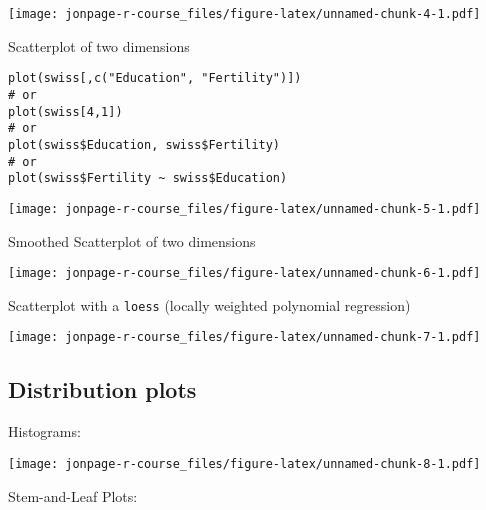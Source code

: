\documentclass[]{book}
\newenvironment{Shaded}{\begin{snugshade}}{\end{snugshade}}
\newcommand{\KeywordTok}[1]{\textcolor[rgb]{0.13,0.29,0.53}{\textbf{{#1}}}}
\newcommand{\StringTok}[1]{\textcolor[rgb]{0.31,0.60,0.02}{{#1}}}
\newcommand{\NormalTok}[1]{{#1}}
\begin{document}
\texttt{[image: jonpage-r-course\_files/figure-latex/unnamed-chunk-4-1.pdf]}

Scatterplot of two dimensions

\begin{verbatim}
plot(swiss[,c("Education", "Fertility")])
# or
plot(swiss[4,1])
# or
plot(swiss$Education, swiss$Fertility)
# or
plot(swiss$Fertility ~ swiss$Education)
\end{verbatim}

\texttt{[image: jonpage-r-course\_files/figure-latex/unnamed-chunk-5-1.pdf]}

Smoothed Scatterplot of two dimensions

\begin{Shaded}
\end{Shaded}

\texttt{[image: jonpage-r-course\_files/figure-latex/unnamed-chunk-6-1.pdf]}

Scatterplot with a \texttt{loess} (locally weighted polynomial
regression)

\begin{Shaded}
\end{Shaded}

\texttt{[image: jonpage-r-course\_files/figure-latex/unnamed-chunk-7-1.pdf]}

\subsection{Distribution plots}\label{distribution-plots}

Histograms:

\begin{Shaded}
\end{Shaded}

\texttt{[image: jonpage-r-course\_files/figure-latex/unnamed-chunk-8-1.pdf]}

Stem-and-Leaf Plots:

\begin{Shaded}
\end{Shaded}
\end{document}
